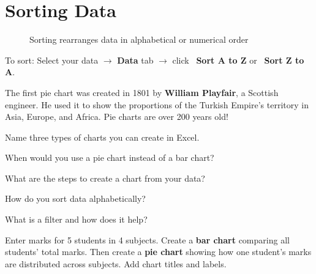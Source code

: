 \section{Sorting Data}
\label{sec:sorting}

\begin{figure}[H]
\centering
{}
\caption{Sorting rearranges data in alphabetical or numerical order}
\label{fig:sorting}
\end{figure}

To sort: Select your data $\rightarrow$ \textbf{Data} tab $\rightarrow$ click \faSortAlphaDown\ \textbf{Sort A to Z} or \faSortAlphaDown\ \textbf{Sort Z to A}.


\begin{funfact}
The first pie chart was created in 1801 by \textbf{William Playfair}, a Scottish engineer. He used it to show the proportions of the Turkish Empire's territory in Asia, Europe, and Africa. Pie charts are over 200 years old!
\end{funfact}

\begin{reviewqs}
  \item Name three types of charts you can create in Excel.
  \item When would you use a pie chart instead of a bar chart?
  \item What are the steps to create a chart from your data?
  \item How do you sort data alphabetically?
  \item What is a filter and how does it help?
\end{reviewqs}

\begin{challenge}
Enter marks for 5 students in 4 subjects. Create a \textbf{bar chart} comparing all students' total marks. Then create a \textbf{pie chart} showing how one student's marks are distributed across subjects. Add chart titles and labels.
\end{challenge}
